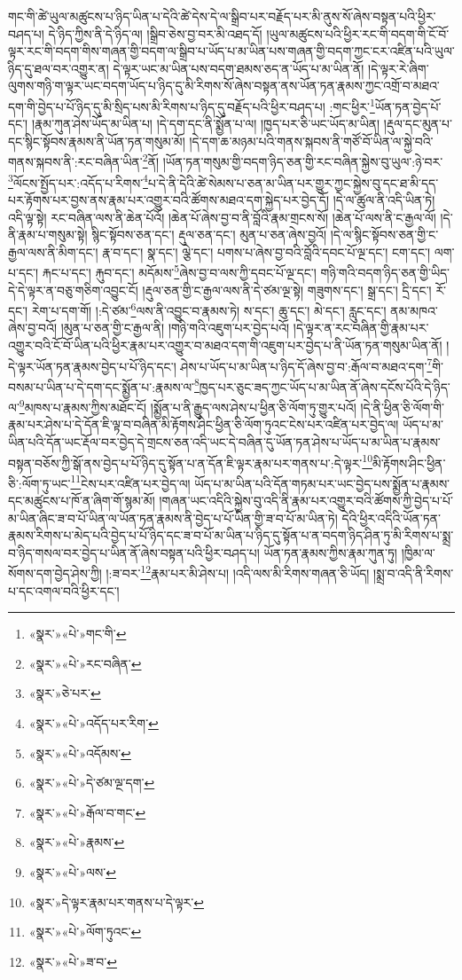 གང་གི་ཚེ་ཡུལ་མཚུངས་པ་ཉིད་ཡིན་པ་དེའི་ཚེ་དེས་དེ་ལ་སྒྲིབ་པར་བརྗོད་པར་མི་ནུས་སོ་ཞེས་བསྟན་པའི་ཕྱིར་བཤད་པ། དེ་ཉིད་ཀྱིས་ནི་དེ་ཉིད་ལ། །སྒྲིབ་ཅེས་བྱ་བར་མི་འཐད་དོ། །ཡུལ་མཚུངས་པའི་ཕྱིར་རང་གི་བདག་གི་ངོ་བོ་ལྟར་རང་གི་བདག་གིས་གཞན་གྱི་བདག་ལ་སྒྲིབ་པ་ཡོད་པ་མ་ཡིན་པས་གཞན་གྱི་བདག་ཀྱང་ངར་འཛིན་པའི་ཡུལ་ཉིད་དུ་ཐལ་བར་འགྱུར་ན། དེ་ལྟར་ཡང་མ་ཡིན་པས་བདག་ཐམས་ཅད་ན་ཡོད་པ་མ་ཡིན་ནོ། །དེ་ལྟར་རེ་ཞིག་ལུགས་གཉི་ག་ལྟར་ཡང་བདག་ཡོད་པ་ཉིད་དུ་མི་རིགས་སོ་ཞེས་བསྟན་ནས་ཡོན་ཏན་རྣམས་ཀྱང་འགྲོ་བ་མཐའ་དག་གི་བྱེད་པ་པོ་ཉིད་དུ་མི་སྲིད་པས་མི་རིགས་པ་ཉིད་དུ་བརྗོད་པའི་ཕྱིར་བཤད་པ། :གང་ཕྱིར་\footnote{«སྣར་»«པེ་»གང་གི་}ཡོན་ཏན་བྱེད་པོ་དང་། །རྣམ་ཀུན་ཤེས་ཡོད་མ་ཡིན་པ། །དེ་དག་དང་ནི་སྨྱོན་པ་ལ། །ཁྱད་པར་ཅི་ཡང་ཡོད་མ་ཡིན། །རྡུལ་དང་མུན་པ་དང་སྙིང་སྟོབས་རྣམས་ནི་ཡོན་ཏན་གསུམ་མོ། །དེ་དག་ཆ་མཉམ་པའི་གནས་སྐབས་ནི་གཙོ་བོ་ཡིན་ལ་སྐྱེ་བའི་གནས་སྐབས་ནི་:རང་བཞིན་ཡིན་\footnote{«སྣར་»«པེ་»རང་བཞིན་}ནོ། །ཡོན་ཏན་གསུམ་གྱི་བདག་ཉིད་ཅན་གྱི་རང་བཞིན་སྐྱེས་བུ་ཡུལ་:ཉེ་བར་\footnote{«སྣར་»ཅེ་པར་}ལོངས་སྤྱོད་པར་:འདོད་པ་རིགས་\footnote{«སྣར་»«པེ་»འདོད་པར་རིག་}པ་དེ་ནི་དེའི་ཚེ་སེམས་པ་ཅན་མ་ཡིན་པར་གྱུར་ཀྱང་སྐྱེས་བུ་དང་ཐ་མི་དད་པར་རྟོགས་པར་བྱས་ནས་རྣམ་པར་འགྱུར་བའི་ཚོགས་མཐའ་དག་སྐྱེད་པར་བྱེད་དོ། །དེ་ལ་ཚུལ་ནི་འདི་ཡིན་ཏེ། འདི་ལྟ་སྟེ། རང་བཞིན་ལས་ནི་ཆེན་པོའོ། །ཆེན་པོ་ཞེས་བྱ་བ་ནི་བློའི་རྣམ་གྲངས་སོ། །ཆེན་པོ་ལས་ནི་ང་རྒྱལ་ལོ། །དེ་ནི་རྣམ་པ་གསུམ་སྟེ། སྙིང་སྟོབས་ཅན་དང་། རྡུལ་ཅན་དང་། མུན་པ་ཅན་ཞེས་བྱའོ། །དེ་ལ་སྙིང་སྟོབས་ཅན་གྱི་ང་རྒྱལ་ལས་ནི་མིག་དང་། རྣ་བ་དང་། སྣ་དང་། ལྕེ་དང་། པགས་པ་ཞེས་བྱ་བའི་བློའི་དབང་པོ་ལྔ་དང་། ངག་དང་། ལག་པ་དང་། རྐང་པ་དང་། རྐུབ་དང་། མདོམས་\footnote{«སྣར་»«པེ་»འདོམས་}ཞེས་བྱ་བ་ལས་ཀྱི་དབང་པོ་ལྔ་དང་། གཉི་གའི་བདག་ཉིད་ཅན་གྱི་ཡིད་དེ་དེ་ལྟར་ན་བཅུ་གཅིག་འབྱུང་ངོ། །རྡུལ་ཅན་གྱི་ང་རྒྱལ་ལས་ནི་དེ་ཙམ་ལྔ་སྟེ། གཟུགས་དང་། སྒྲ་དང་། དྲི་དང་། རོ་དང་། རེག་པ་དག་གོ། །:དེ་ཙམ་\footnote{«སྣར་»«པེ་»དེ་ཙམ་ལྔ་དག་}ལས་ནི་འབྱུང་བ་རྣམས་ཏེ། ས་དང་། ཆུ་དང་། མེ་དང་། རླུང་དང་། ནམ་མཁའ་ཞེས་བྱ་བའོ། །མུན་པ་ཅན་གྱི་ང་རྒྱལ་ནི། །གཉི་གའི་འཇུག་པར་བྱེད་པའོ། །དེ་ལྟར་ན་རང་བཞིན་གྱི་རྣམ་པར་འགྱུར་བའི་ངོ་བོ་ཡིན་པའི་ཕྱིར་རྣམ་པར་འགྱུར་བ་མཐའ་དག་གི་འཇུག་པར་བྱེད་པ་ནི་ཡོན་ཏན་གསུམ་ཡིན་ནོ། །དེ་ལྟར་ཡོན་ཏན་རྣམས་བྱེད་པ་པོ་ཉིད་དང་། ཤེས་པ་ཡོད་པ་མ་ཡིན་པ་ཉིད་དོ་ཞེས་བྱ་བ་:རྒོལ་བ་མཐའ་དག་\footnote{«སྣར་»«པེ་»རྒོལ་བ་གང་}གི་བསམ་པ་ཡིན་པ་དེ་དག་དང་སྨྱོན་པ་:རྣམས་ལ་\footnote{«སྣར་»«པེ་»རྣམས་}ཁྱད་པར་ཅུང་ཟད་ཀྱང་ཡོད་པ་མ་ཡིན་ནོ་ཞེས་དངོས་པོའི་དེ་ཉིད་ལ་\footnote{«སྣར་»«པེ་»ལས་}མཁས་པ་རྣམས་ཀྱིས་མཐོང་ངོ། །སྨྱོན་པ་ནི་རྒྱུད་ལས་ཤེས་པ་ཕྱིན་ཅི་ལོག་ཏུ་གྱུར་པའོ། །དེ་ནི་ཕྱིན་ཅི་ལོག་གི་རྣམ་པར་ཤེས་པ་དེ་དོན་ཇི་ལྟ་བ་བཞིན་མི་རྟོགས་ཤིང་ཕྱིན་ཅི་ལོག་ཏུའང་ངེས་པར་འཛིན་པར་བྱེད་ལ། ཡོད་པ་མ་ཡིན་པའི་དོན་ཡང་རྡོལ་བར་བྱེད་དེ་གྲངས་ཅན་འདི་ཡང་དེ་བཞིན་དུ་ཡོན་ཏན་ཤེས་པ་ཡོད་པ་མ་ཡིན་པ་རྣམས་བསྟན་བཅོས་ཀྱི་སྒོ་ནས་བྱེད་པ་པོ་ཉིད་དུ་སྟོན་པ་ན་དོན་ཇི་ལྟར་རྣམ་པར་གནས་པ་:དེ་ལྟར་\footnote{«སྣར་»དེ་ལྟར་རྣམ་པར་གནས་པ་དེ་ལྟར་}མི་རྟོགས་ཤིང་ཕྱིན་ཅི་:ལོག་ཏུ་ཡང་\footnote{«སྣར་»«པེ་»ལོག་ཏུའང་}ངེས་པར་འཛིན་པར་བྱེད་ལ། ཡོད་པ་མ་ཡིན་པའི་དོན་གཏམ་པར་ཡང་བྱེད་པས་སྨྱོན་པ་རྣམས་དང་མཚུངས་པ་ཁོ་ན་ཞིག་གོ་སྙམ་མོ། །གཞན་ཡང་འདིའི་སྐྱེས་བུ་འདི་ནི་རྣམ་པར་འགྱུར་བའི་ཚོགས་ཀྱི་བྱེད་པ་པོ་མ་ཡིན་ཞིང་ཟ་བ་པོ་ཡིན་ལ་ཡོན་ཏན་རྣམས་ནི་བྱེད་པ་པོ་ཡིན་གྱི་ཟ་བ་པོ་མ་ཡིན་ཏེ། དེའི་ཕྱིར་འདིའི་ཡོན་ཏན་རྣམས་རིགས་པ་མེད་པའི་བྱེད་པ་པོ་ཉིད་དང་ཟ་བ་པོ་མ་ཡིན་པ་ཉིད་དུ་སྟོན་པ་ན་བདག་ཉིད་ཤིན་ཏུ་མི་རིགས་པ་སྨྲ་བ་ཉིད་གསལ་བར་བྱེད་པ་ཡིན་ནོ་ཞེས་བསྟན་པའི་ཕྱིར་བཤད་པ། ཡོན་ཏན་རྣམས་ཀྱིས་རྣམ་ཀུན་ཏུ། །ཁྱིམ་ལ་སོགས་དག་བྱེད་ཤེས་ཀྱི། །:ཟ་བར་\footnote{«སྣར་»«པེ་»ཟ་བ་}རྣམ་པར་མི་ཤེས་པ། །འདི་ལས་མི་རིགས་གཞན་ཅི་ཡོད། །སྨྲ་བ་འདི་ནི་རིགས་པ་དང་འགལ་བའི་ཕྱིར་དང་། 